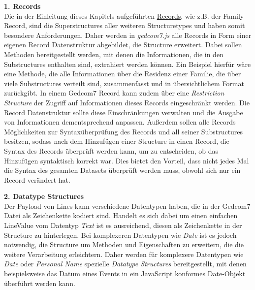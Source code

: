 \vspace{1em}
\textbf{1. Records} \vspace{0.5em} \\
Die in der Einleitung dieses Kapitels aufgeführten \hyperref[liste records]{Records}, wie z.B. der Family Record, sind die Superstructures aller weiteren Structuretypes und haben somit besondere Anforderungen. Daher werden in \textit{gedcom7.js} alle Records in Form einer eigenen Record Datenstruktur abgebildet, die Structure erweitert. Dabei sollen Methoden bereitgestellt werden, mit denen die Informationen, die in den Substructures enthalten sind, extrahiert werden können. Ein Beispiel hierfür wäre eine Methode, die alle Informationen über die Residenz einer Familie, die über viele Substructures verteilt sind, zusammenfasst und in übersichtlichem Format zurückgibt. In einem Gedcom7 Record kann zudem über eine \textit{Restriction Structure} der Zugriff auf Informationen dieses Records eingeschränkt werden. Die Record Datenstruktur sollte diese Einschränkungen verwalten und die Ausgabe von Informationen dementsprechend anpassen. Außerdem sollen alle Records Möglichkeiten zur Syntaxüberprüfung des Records und all seiner Substructures besitzen, sodass nach dem Hinzufügen einer Structure in einen Record, die Syntax des Records überprüft werden kann, um zu entscheiden, ob das Hinzufügen syntaktisch korrekt war. Dies bietet den Vorteil, dass nicht jedes Mal die Syntax des gesamten Datasets überprüft werden muss, obwohl sich nur ein Record verändert hat.

\vspace{1em}
\textbf{2. Datatype Structures} \vspace{0.5em} \\
Der Payload von Lines kann verschiedene Datentypen haben, die in der Gedcom7 Datei als Zeichenkette kodiert sind. Handelt es sich dabei um einen einfachen LineValue vom Datentyp \textit{Text} ist es ausreichend, diesen als Zeichenkette in der Structure zu hinterlegen. Bei komplexeren Datentypen wie \textit{Date} ist es jedoch notwendig, die Structure um Methoden und Eigenschaften zu erweitern, die die weitere Verarbeitung erleichtern. Daher werden für komplexere Datentypen wie \textit{Date} oder \textit{Personal Name} spezielle \textit{Datatype Structures} bereitgestellt, mit denen beispielsweise das Datum eines Events in ein JavaScript konformes Date-Objekt überführt werden kann.

